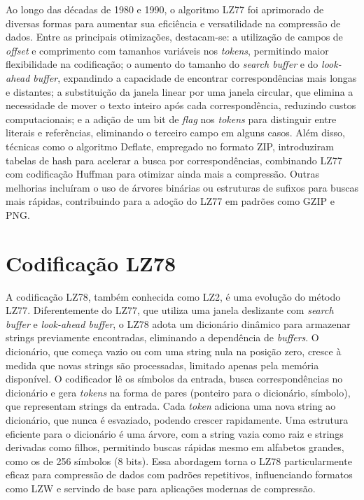 Ao longo das décadas de 1980 e 1990, o algoritmo LZ77 foi aprimorado de
diversas formas para aumentar sua eficiência e versatilidade na compressão de
dados. Entre as principais otimizações, destacam-se: a utilização de campos
de \emph{offset} e comprimento com tamanhos variáveis nos \emph{tokens}, permitindo maior
flexibilidade na codificação; o aumento do tamanho do \emph{search buffer} e do
\emph{look-ahead buffer}, expandindo a capacidade de encontrar correspondências mais
longas e distantes; a substituição da janela linear por uma janela circular,
que elimina a necessidade de mover o texto inteiro após cada correspondência,
reduzindo custos computacionais; e a adição de um bit de \emph{flag} nos \emph{tokens} para
distinguir entre literais e referências, eliminando o terceiro campo em
alguns casos. Além disso, técnicas como o algoritmo Deflate, empregado no
formato ZIP, introduziram tabelas de hash para acelerar a busca por
correspondências, combinando LZ77 com codificação Huffman para otimizar ainda
mais a compressão. Outras melhorias incluíram o uso de árvores binárias ou
estruturas de sufixos para buscas mais rápidas, contribuindo para a adoção do
LZ77 em padrões como GZIP e PNG.





\section{Codificação LZ78}

A codificação LZ78, também conhecida como LZ2, é uma evolução do método
LZ77. Diferentemente do LZ77, que utiliza uma janela deslizante com \emph{search buffer} e
\emph{look-ahead buffer}, o LZ78 adota um dicionário dinâmico para armazenar
strings previamente encontradas, eliminando a dependência de \emph{buffers}. O
dicionário, que começa vazio ou com uma string nula na posição zero, cresce à
medida que novas strings são processadas, limitado apenas pela memória
disponível. O codificador lê os símbolos da entrada, busca correspondências no
dicionário e gera \emph{tokens} na forma de pares (ponteiro para o
dicionário, símbolo), que representam strings da entrada. Cada \emph{token}
adiciona uma nova string ao dicionário, que nunca é esvaziado, podendo crescer
rapidamente. Uma estrutura eficiente para o dicionário é uma árvore, com a
string vazia como raiz e strings derivadas como filhos, permitindo buscas
rápidas mesmo em alfabetos grandes, como os de 256 símbolos (8 bits). Essa
abordagem torna o LZ78 particularmente eficaz para compressão de dados com
padrões repetitivos, influenciando formatos como LZW e servindo de base para
aplicações modernas de compressão.

